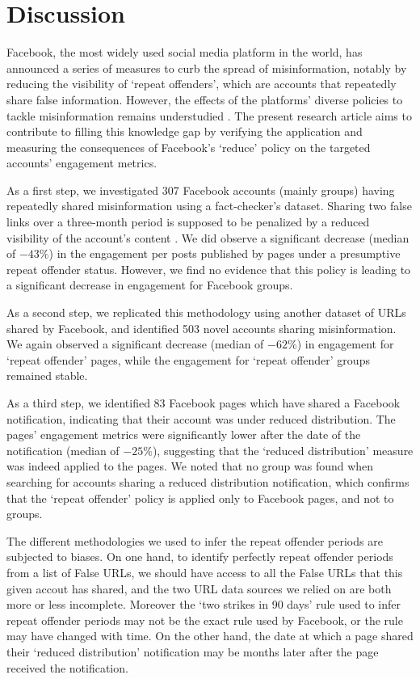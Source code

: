 \documentclass[review]{elsarticle}
\begin{document}
{{\section{Discussion}

Facebook, the most widely used social media platform in the world, has announced a series of measures to curb the spread of misinformation, notably by reducing the visibility of `repeat offenders', which are accounts that repeatedly share false information. 
However, the effects of the platforms' diverse policies to tackle misinformation remains understudied \citep{pasquetto2020tackling}. 
The present research article aims to contribute to filling this knowledge gap by verifying the application and measuring the consequences of Facebook's `reduce' policy on the targeted accounts' engagement metrics.

As a first step, we investigated 307 Facebook accounts (mainly groups) having repeatedly shared misinformation using a fact-checker's dataset. 
Sharing two false links over a three-month period is supposed to be penalized by a reduced visibility of the account's content \cite{2strikes90daysRule}. 
We did observe a significant decrease (median of $-43\%$) in the engagement per posts published by pages under a presumptive repeat offender status.
However, we find no evidence that this policy is leading to a significant decrease in engagement for Facebook groups.

As a second step, we replicated this methodology using another dataset of URLs shared by Facebook, and identified 503 novel accounts sharing misinformation. 
We again observed a significant decrease (median of $-62\%$) in engagement for `repeat offender' pages, while the engagement for `repeat offender' groups remained stable.
 
As a third step, we identified 83 Facebook pages which have shared a Facebook notification, indicating that their account was under reduced distribution.
The pages' engagement metrics were significantly lower after the date of the notification (median of $-25\%$), suggesting that the `reduced distribution' measure was indeed applied to the pages.
We noted that no group was found when searching for accounts sharing a reduced distribution notification, which confirms that the `repeat offender' policy is applied only to Facebook pages, and not to groups.

The different methodologies we used to infer the repeat offender periods are subjected to biases.
On one hand, to identify perfectly repeat offender periods from a list of False URLs, we should have access to all the False URLs that this given accout has shared, and the two URL data sources we relied on are both more or less incomplete.
Moreover the `two strikes in 90 days' rule used to infer repeat offender periods may not be the exact rule used by Facebook, or the rule may have changed with time.
On the other hand, the date at which a page shared their `reduced distribution' notification may be months later after the page received the notification.

}}
\end{document}
